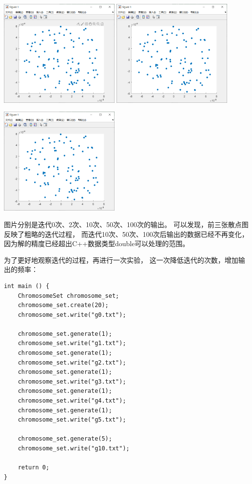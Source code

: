 \documentclass[UTF8]{ctexart}
\begin{document}
\includegraphics[width = 0.45\textwidth]{test1_03.png}
\includegraphics[width = 0.45\textwidth]{test1_04.png}

\includegraphics[width = 0.45\textwidth]{test1_05.png}

图片分别是迭代0次、2次、10次、50次、100次的输出。
可以发现，前三张散点图反映了粗略的迭代过程，
而迭代10次、50次、100次后输出的数据已经不再变化，
因为解的精度已经超出C++数据类型double可以处理的范围。

为了更好地观察迭代的过程，再进行一次实验，
这一次降低迭代的次数，增加输出的频率：

\begin{lstlisting}
int main () {
    ChromosomeSet chromosome_set;
    chromosome_set.create(20);
    chromosome_set.write("g0.txt");

    chromosome_set.generate(1);
    chromosome_set.write("g1.txt");
    chromosome_set.generate(1);
    chromosome_set.write("g2.txt");
    chromosome_set.generate(1);
    chromosome_set.write("g3.txt");
    chromosome_set.generate(1);
    chromosome_set.write("g4.txt");
    chromosome_set.generate(1);
    chromosome_set.write("g5.txt");

    chromosome_set.generate(5);
    chromosome_set.write("g10.txt");

    return 0;
}
\end{lstlisting}
\end{document}
